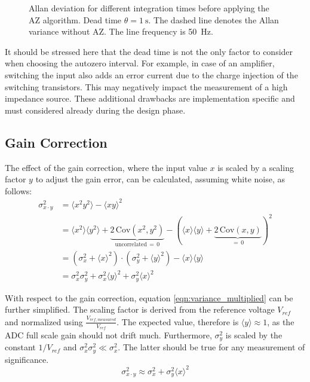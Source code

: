 \begin{figure}[ht]
    \centering
    
    \caption{Allan deviation for different integration times before applying the AZ algorithm. Dead time $\theta = \qty{1}{\s}$. The dashed line denotes the Allan variance without AZ. The line frequency is \qty{50}{\Hz}.}
    \label{fig:autozero_deadtime_nplcs_adev}
\end{figure}

It should be stressed here that the dead time is not the only factor to consider when choosing the autozero interval. For example, in case of an amplifier, switching the input also adds an error current due to the charge injection of the switching transistors. This may negatively impact the measurement of a high impedance source. These additional drawbacks are implementation specific and must considered already during the design phase.

\clearpage
\subsection{Gain Correction}%
\label{sec:autozero_gain}
The effect of the gain correction, where the input value $x$ is scaled by a scaling factor $y$ to adjust the gain error, can be calculated, assuming white noise, as follows:
\begin{align}
    \sigma_{x \cdot y}^2 &= \langle x^2 y^2 \rangle - \langle x y \rangle^2 \nonumber\\
    &= \langle x^2 \rangle \langle y^2 \rangle + \underbrace{2\,\mathrm{Cov}\left(x^2,y^2\right)}_{\text{uncorrelated} \, = \, 0} - \left( \langle x \rangle \langle y \rangle + \underbrace{2\,\mathrm{Cov}\left(x,y\right)}_{=\, 0} \right)^2 \nonumber\\
    &= \left(\sigma_x^2 + \langle x \rangle^2\right) \cdot \left(\sigma_y^2 + \langle y \rangle^2\right) - \langle x \rangle \langle y \rangle \nonumber\\
    &= \sigma_x^2 \sigma_y^2 + \sigma_x^2 \langle y \rangle^2 + \sigma_y^2 \langle x \rangle^2 \label{eqn:variance_multiplied}
\end{align}

With respect to the gain correction, equation \ref{eqn:variance_multiplied} can be further simplified. The scaling factor is derived from the reference voltage $V_{ref}$ and normalized using $\frac{V_{ref, measured}}{V_{ref}}$. The expected value, therefore is $\langle y \rangle \approx 1$, as the ADC full scale gain should not drift much. Furthermore, $\sigma_y^2$ is scaled by the constant $1/V_{ref}$ and $\sigma_x^2 \sigma_y^2 \ll \sigma_x^2$. The latter should be true for any measurement of significance.
\begin{equation}
    \sigma_{x \cdot y}^2 \approx \sigma_x^2 + \sigma_y^2 \langle x \rangle^2
\end{equation}

